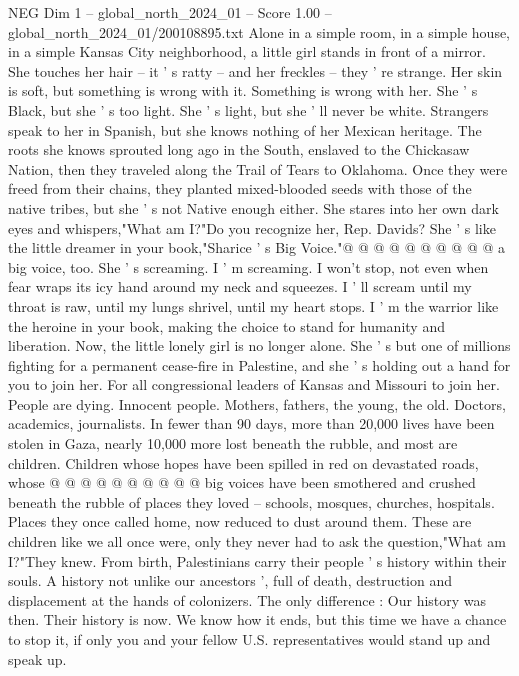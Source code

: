 \begin{textsample}{NEG Dim 1 – global\_north\_2024\_01 – Score 1.00 – global\_north\_2024\_01/200108895.txt}  \label{ex:f1_neg_334}
Alone in a simple room, in a simple house, in a simple Kansas City neighborhood, a little girl stands in front of a mirror.
She touches her hair -- it ' s ratty -- and her freckles -- they ' re strange.
Her skin is soft, but something is wrong with it.
Something is wrong with her.
She ' s Black, but she ' s too light.
She ' s light, but she ' ll never be white.
Strangers speak to her in Spanish, but she knows nothing of her Mexican heritage.
The roots she knows sprouted long ago in the South, enslaved to the Chickasaw Nation, then they traveled along the Trail of Tears to Oklahoma.
Once they were freed from their chains, they planted mixed-blooded seeds with those of the native tribes, but she ' s not Native enough either.
She stares into her own dark eyes and whispers,"What am I?"Do you recognize her, Rep.
Davids?
She ' s like the little dreamer in your book,"Sharice ' s Big Voice."@ @ @ @ @ @ @ @ @ @ a big voice, too.
She ' s screaming.
I ' m screaming.
I won't stop, not even when fear wraps its icy hand around my neck and squeezes.
I ' ll scream until my throat is raw, until my lungs shrivel, until my heart stops.
I ' m the warrior like the heroine in your book, making the choice to stand for humanity and liberation.
Now, the little lonely girl is no longer alone.
She ' s but one of millions fighting for a permanent cease-fire in Palestine, and she ' s holding out a hand for you to join her.
For all congressional leaders of Kansas and Missouri to join her.
People are dying.
Innocent people.
Mothers, fathers, the young, the old.
Doctors, academics, journalists.
In fewer than 90 days, more than 20,000 lives have been stolen in Gaza, nearly 10,000 more lost beneath the rubble, and most are children.
Children whose hopes have been spilled in red on devastated roads, whose @ @ @ @ @ @ @ @ @ @ big voices have been smothered and crushed beneath the rubble of places they loved -- schools, mosques, churches, hospitals.
Places they once called home, now reduced to dust around them.
These are children like we all once were, only they never had to ask the question,"What am I?"They knew.
From birth, Palestinians carry their people ' s history within their souls.
A history not unlike our ancestors ', full of death, destruction and displacement at the hands of colonizers.
The only difference : Our history was then.
Their history is now.
We know how it ends, but this time we have a chance to stop it, if only you and your fellow U.S. representatives would stand up and speak up.

\end{textsample}
